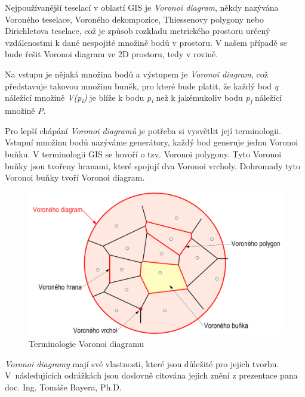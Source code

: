 Nejpoužívanější teselací v oblastí GIS je \textit{Voronoi diagram}, někdy nazývána Voro\-ného teselace, Voroného dekompozice,
Thiessenovy polygony nebo Dirichletova tese\-lace, což je způsob rozkladu 
metrického prostoru určený vzdálenostmi k dané nespojité množině bodů v prostoru.
V našem případě se bude řešit Voronoi diagram ve 2D prostoru, tedy v rovině.

Na vstupu je nějaká množina bodů a výstupem je \textit{Voronoi diagram}, 
což představuje takovou množinu buněk, pro které bude platit, že každý bod
\textit{q} náležící množině \textit{V(p\textsubscript{i})} je blíže k bodu
\textit{p\textsubscript{i}} než k jakémukoliv
bodu \textit{p\textsubscript{j}} náležící množině \textit{P}.  \cite{bayer-voronoi}

Pro lepší chápání \textit{Voronoi diagramů} je potřeba si vysvětlit její terminologii.
Vstup\-ní množinu bodů nazýváme generátory, každý bod generuje jednu Voronoi buňku. V 
terminologii GIS se hovoří o tzv. Voronoi polygony. Tyto Voronoi buňky jsou tvořeny hranami,
které spojují dva Voronoi vrcholy. Dohromady tyto Voronoi buňky tvoří Voronoi diagram.  

\begin{figure}[H] \centering
    \includegraphics[width=400pt]{./pictures/bayer-voronoi-terminologie.png}
    \caption[Terminologie Voronoi diagramu]{Terminologie Voronoi diagramu \cite{bayer-voronoi}}
	\label{fig:bayer-voronoi-terminologie}              
\end{figure}

\textit{Voronoi diagramy} mají své vlastnosti, které jsou důležité pro jejich tvorbu. V~následujících
odrážkách jsou doslovně citována jejich znění z prezentace pana doc. Ing. Tomáše Bayera, Ph.D.

